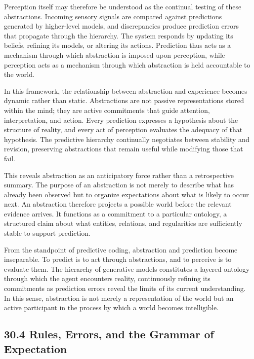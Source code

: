 \documentclass[12pt,letterpaper]{article}
\theoremstyle{remark}
\begin{document}
Perception itself may therefore be understood as the continual testing of these abstractions. Incoming sensory signals are compared against predictions generated by higher-level models, and discrepancies produce prediction errors that propagate through the hierarchy. The system responds by updating its beliefs, refining its models, or altering its actions. Prediction thus acts as a mechanism through which abstraction is imposed upon perception, while perception acts as a mechanism through which abstraction is held accountable to the world.

In this framework, the relationship between abstraction and experience becomes dynamic rather than static. Abstractions are not passive representations stored within the mind; they are active commitments that guide attention, interpretation, and action. Every prediction expresses a hypothesis about the structure of reality, and every act of perception evaluates the adequacy of that hypothesis. The predictive hierarchy continually negotiates between stability and revision, preserving abstractions that remain useful while modifying those that fail.

This reveals abstraction as an anticipatory force rather than a retrospective summary. The purpose of an abstraction is not merely to describe what has already been observed but to organize expectations about what is likely to occur next. An abstraction therefore projects a possible world before the relevant evidence arrives. It functions as a commitment to a particular ontology, a structured claim about what entities, relations, and regularities are sufficiently stable to support prediction.

From the standpoint of predictive coding, abstraction and prediction become inseparable. To predict is to act through abstractions, and to perceive is to evaluate them. The hierarchy of generative models constitutes a layered ontology through which the agent encounters reality, continuously refining its commitments as prediction errors reveal the limits of its current understanding. In this sense, abstraction is not merely a representation of the world but an active participant in the process by which a world becomes intelligible.

\subsection{30.4 Rules, Errors, and the Grammar of Expectation}
\end{document}
